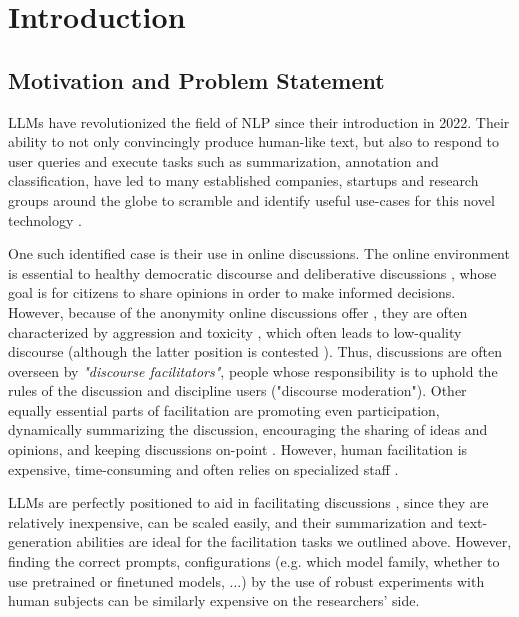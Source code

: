 %
\chapter{Introduction}
\label{sec:intro}

\section{Motivation and Problem Statement}
\label{sec:intro:motivation}

\acp{LLM} have revolutionized the field of \ac{NLP} since their introduction in 2022. Their ability to not only convincingly produce human-like text, but also to respond to user queries and execute tasks such as summarization, annotation and classification, have led to many established companies, startups and research groups around the globe to scramble and identify useful use-cases for this novel technology \cite{HadiASO, Zhou2024LargeLM, Hutchinson2024LLMAssistedVA}.

One such identified case is their use in online discussions. The online environment is essential to  healthy democratic discourse \cite{WrightDemocracy, Janssen2005, Papacharissi2004DemocracyOC} and deliberative discussions \cite{small2021polis}, whose goal is for citizens to share opinions in order to make informed decisions. However, because of the anonymity online discussions offer \cite{Avalle2024PersistentIP}, they are often characterized by aggression and toxicity \cite{XiaToxicity}, which often leads to low-quality discourse \cite{WrightDemocracy} (although the latter position is contested \cite{Papacharissi2004DemocracyOC}). Thus, discussions are often overseen by \textit{"discourse facilitators"}, people whose responsibility is to uphold the rules of the discussion and discipline users ("discourse moderation"). Other equally essential parts of facilitation are promoting even participation, dynamically summarizing the discussion, encouraging the sharing of ideas and opinions, and keeping discussions on-point \cite{Harvard2024, Wang2008StudentfacilitatorsRI}. However, human facilitation is expensive, time-consuming and often relies on specialized staff \cite{small-polis-llm}.

LLMs are perfectly positioned to aid in facilitating discussions \cite{small-polis-llm}, since they are relatively inexpensive, can be scaled easily, and their summarization and text-generation abilities are ideal for the facilitation tasks we outlined above. However, finding the correct prompts, configurations (e.g. which model family, whether to use pretrained or finetuned models, ...) by the use of robust experiments with human subjects can be similarly expensive on the researchers' side.

